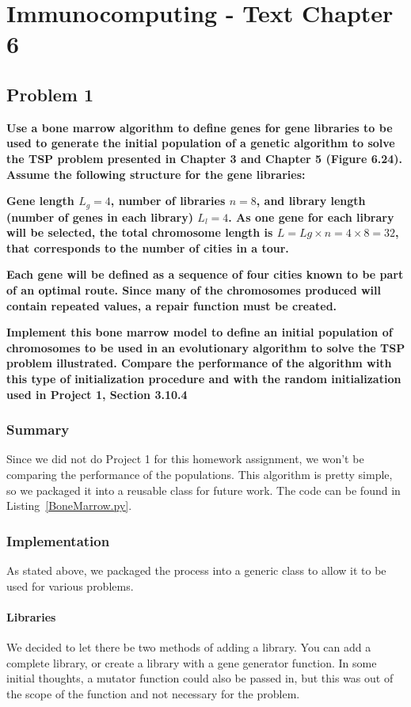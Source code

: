 
\chapter{Immunocomputing - Text Chapter 6}

\section{Problem 1}
\textbf{Use a bone marrow algorithm to define genes for gene libraries to be used to generate the initial population of a genetic algorithm to solve the TSP problem presented in Chapter 3 and Chapter 5 (Figure 6.24). Assume the following structure for the gene libraries:}

\textbf{Gene length $L_g = 4$, number of libraries $n = 8$, and library length (number of genes in each library) $L_l = 4$. As one gene for each library will be selected, the total chromosome length is $L = Lg \times n = 4 \times 8 = 32$, that corresponds to the number of cities in a tour.}

\textbf{Each gene will be defined as a sequence of four cities known to be part of an optimal route. Since many of the chromosomes produced will contain repeated values, a repair function must be created.}

\textbf{Implement this bone marrow model to define an initial population of chromosomes to be used in an evolutionary algorithm to solve the TSP problem illustrated. Compare the performance of the algorithm with this type of initialization procedure and with the random initialization used in Project 1, Section 3.10.4}

\subsection{Summary}
Since we did not do Project 1 for this homework assignment, we won't be comparing the performance of the populations. This algorithm is pretty simple, so we packaged it into a reusable class for future work. The code can be found in Listing~\ref{BoneMarrow.py}.

\subsection{Implementation}
As stated above, we packaged the process into a generic class to allow it to be used for various problems.

\subsubsection{Libraries}
We decided to let there be two methods of adding a library. You can add a complete library, or create a library with a gene generator function. In some initial thoughts, a mutator function could also be passed in, but this was out of the scope of the function and not necessary for the problem.

